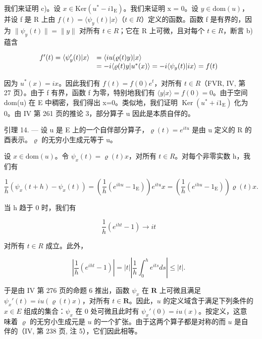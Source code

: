 我们来证明 c)。设 \(x \in \text{Ker}(u^{*} - i1_{\text{E}})\)。我们来证明 x = 0。设 \(y \in \text{dom}(u)\)，并设 f 是 R 上由 \(f(t) = \langle \psi_{y}(t) | x \rangle\)（\(t \in R\)）定义的函数。函数 f 是有界的，因为 \(\| \psi_{y}(t) \| = \| y \|\) 对所有 \(t \in R\)；它在 R 上可微，且对每个 \(t \in R\)，断言 b) 蕴含

\[
\begin{array}{r l} f ^ {\prime} (t) = \langle \psi_ {y} ^ {\prime} (t) | x \rangle & = \langle i u (\varrho (t) y) | x \rangle \\ & = - i \langle \varrho (t) y | u ^ {*} (x) \rangle = - i \langle \psi_ {y} (t) | i x \rangle = f (t) \end{array}
\]

因为 \(u^{*}(x)=ix\)。因此我们有 \(f(t)=f(0)e^{t}\)，对所有 \(t\in R\)（FVR, IV, 第 27 页）。由于 f 有界，函数 f 为零，特别地我们有 \(\langle y|x\rangle=f(0)=0\)。由于空间 dom(u) 在 E 中稠密，我们得出 x=0。类似地，我们证明 \(\operatorname{Ker}(u^{*}+i1_{\mathrm{E}})\) 化为 0。由 IV 第 261 页的推论 3，部分算子 u 因此是本质自伴的。

引理 14. --- 设 u 是 E 上的一个自伴部分算子，\(\varrho(t) = e^{itu}\) 是由 u 定义的 R 的酉表示。\(\varrho\) 的无穷小生成元等于 u。

设 \(x \in \text{dom}(u)\)。令 \(\psi_{x}(t) = \varrho(t)x\)，对所有 \(t \in R\)。对每个非零实数 h，我们有

\[
\frac {1}{h} \left(\psi_ {x} (t + h) - \psi_ {x} (t)\right) = \left(\frac {1}{h} \left(e ^ {i h u} - 1 _ {\mathrm{E}}\right)\right) e ^ {i t u} x = \left(\frac {1}{h} \left(e ^ {i h u} - 1 _ {\mathrm{E}}\right)\right) \varrho (t) x.
\]

当 h 趋于 0 时，我们有

\[
\frac {1}{h} (e ^ {i h t} - 1) \rightarrow i t
\]

对所有 \(t \in R\) 成立。此外，

\[
\left| \frac {1}{h} (e ^ {i h t} - 1) \right| = | t | \left| \frac {1}{h} \int_ {0} ^ {h} e ^ {i t s} d s \right| \leqslant | t |.
\]

于是由 IV 第 276 页的命题 6 推出，函数 \(\psi_x\) 在 \(\mathbf{R}\) 上可微且满足 \(\psi_x'(t) = i u(\varrho(t)x)\)，对所有 \(t \in \mathbf{R}\)。因此，\(u\) 的定义域含于满足下列条件的 \(x \in E\) 组成的集合：\(\psi_x\) 在 0 处可微且此时有 \(\psi_x'(0) = i u(x)\)。按定义，这意味着 \(\varrho\) 的无穷小生成元是 \(u\) 的一个扩张。由于这两个算子都是对称的而 \(u\) 是自伴的（IV, 第 238 页, 注 5），它们因此相等。

